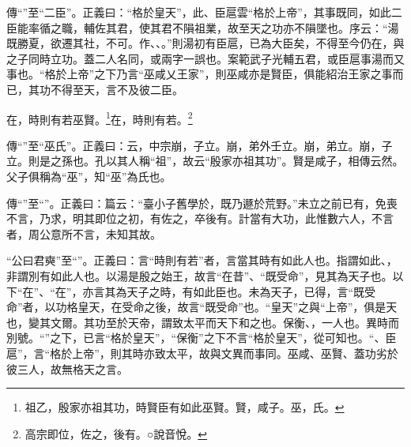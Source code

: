 {\noindent\zhuan{}\fzbyks 傳“”至“二臣”。正義曰：“格於皇天”，此、臣扈雲“格於上帝”，其事既同，如此二臣能率循之職，輔佐其君，使其君不隕祖業，故至天之功亦不隕墜也。序云：“湯既勝夏，欲遷其社，不可。作、、。”則湯初有臣扈，已為大臣矣，不得至今仍在，與之子同時立功。蓋二人名同，或兩字一誤也。案範武子光輔五君，或臣扈事湯而又事也。“格於上帝”之下乃言“巫咸乂王家”，則巫咸亦是賢臣，俱能紹治王家之事而已，其功不得至天，言不及彼二臣。 \par}

在，時則有若巫賢。\footnote{祖乙，殷家亦祖其功，時賢臣有如此巫賢。賢，咸子。巫，氏。}在，時則有若。\footnote{高宗即位，佐之，後有。○說音悅。}

{\noindent\zhuan{}\fzbyks 傳“”至“巫氏”。正義曰：云，中宗崩，子立。崩，弟外壬立。崩，弟立。崩，子立。則是之孫也。孔以其人稱“祖”，故云“殷家亦祖其功”。賢是咸子，相傳云然。父子俱稱為“巫”，知“巫”為氏也。 \par}

{\noindent\zhuan{}\fzbyks 傳“”至“”。正義曰：篇云：“臺小子舊學於，既乃遯於荒野。”未立之前已有，免喪不言，乃求，明其即位之初，有佐之，卒後有。計當有大功，此惟數六人，不言者，周公意所不言，未知其故。 \par}

{\noindent\shu{}\fzkt “公曰君奭”至“”。正義曰：言“時則有若”者，言當其時有如此人也。指謂如此、，非謂別有如此人也。以湯是殷之始王，故言“在昔”、“既受命”，見其為天子也。以下“在”、“在”，亦言其為天子之時，有如此臣也。未為天子，已得，言“既受命”者，以功格皇天，在受命之後，故言“既受命”也。“皇天”之與“上帝”，俱是天也，變其文爾。其功至於天帝，謂致太平而天下和之也。保衡、，一人也。異時而別號。“”之下，已言“格於皇天”，“保衡”之下不言“格於皇天”，從可知也。“、臣扈”，言“格於上帝”，則其時亦致太平，故與文異而事同。巫咸、巫賢、蓋功劣於彼三人，故無格天之言。 \par}

